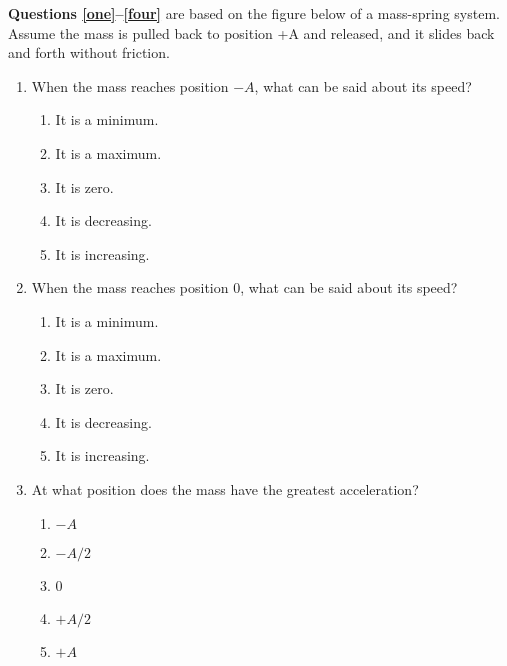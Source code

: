 \documentclass{../../../oss-apphys}
\begin{document}
\begin{multicols}{2}
  \textbf{Questions \ref{one}--\ref{four}} are based on the figure below of a
  mass-spring system. Assume the mass is pulled back to position +A and
  released, and it slides back and forth without friction.
  \begin{center}
  \end{center}
  \begin{enumerate}[leftmargin=18pt,resume]
  \item When the mass reaches position $-A$, what can be said about its speed?
    \label{one}
    \begin{enumerate}[noitemsep,topsep=0pt,leftmargin=18pt,label=(\Alph*)]
    \item It is a minimum.
    \item It is a maximum.
    \item It is zero.
    \item It is decreasing.
    \item It is increasing.
    \end{enumerate}
    
  \item When the mass reaches position 0, what can be said about its speed?
    \begin{enumerate}[noitemsep,topsep=0pt,leftmargin=18pt,label=(\Alph*)]
    \item It is a minimum.
    \item It is a maximum.
    \item It is zero.
    \item It is decreasing.
    \item It is increasing.
    \end{enumerate}
    
  \item At what position does the mass have the greatest acceleration?
    \begin{enumerate}[noitemsep,topsep=0pt,leftmargin=18pt,label=(\Alph*)]
    \item $-A$
    \item $-A/2$
    \item 0
    \item $+A/2$
    \item $+A$
    \end{enumerate}
    

\end{enumerate}
\end{multicols}
\end{document}
